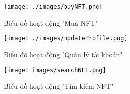 \begin{figure}[H]
    \centering
    \texttt{[image: ./images/buyNFT.png]}
    \caption{Biểu đồ hoạt động "Mua NFT"}
    \label{fig:muanft}
\end{figure}

\begin{figure}[H]
    \centering
    \texttt{[image: ./images/updateProfile.png]}
    \caption{Biểu đồ hoạt động "Quản lý tài khoản"}
    \label{fig:quanly}
\end{figure}

\begin{figure}[H]
    \centering
    \texttt{[image: images/searchNFT.png]}
    \caption{Biểu đồ hoạt động "Tìm kiếm NFT"}
    \label{fig:timkiem}
\end{figure}

